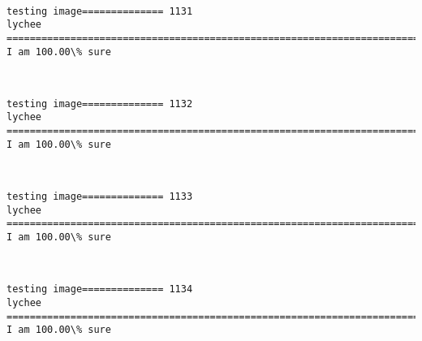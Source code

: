 \documentclass[11pt]{article}
\begin{document}
    \begin{center}
    \end{center}
    { \hspace*{\fill} \\}
    
    \begin{Verbatim}[commandchars=\\\{\}]
testing image============== 1131
lychee
============================================================================
I am 100.00\% sure

    \end{Verbatim}

    \begin{center}
    \end{center}
    { \hspace*{\fill} \\}
    
    \begin{Verbatim}[commandchars=\\\{\}]
testing image============== 1132
lychee
============================================================================
I am 100.00\% sure

    \end{Verbatim}

    \begin{center}
    \end{center}
    { \hspace*{\fill} \\}
    
    \begin{Verbatim}[commandchars=\\\{\}]
testing image============== 1133
lychee
============================================================================
I am 100.00\% sure

    \end{Verbatim}

    \begin{center}
    \end{center}
    { \hspace*{\fill} \\}
    
    \begin{Verbatim}[commandchars=\\\{\}]
testing image============== 1134
lychee
============================================================================
I am 100.00\% sure

    \end{Verbatim}
\end{document}
